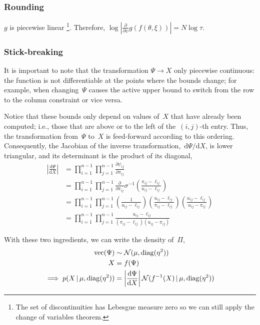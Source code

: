 \documentclass[twoside]{article}
\begin{document}
\subsubsection*{Rounding}

 $g$ is piecewise linear
\footnote{The set of discontinuities has Lebesgue measure zero so we
  can still apply the change of variables theorem.}. Therefore, 
$\log | \tfrac{\partial}{\partial \psi} g(f(\theta, \xi)) |= N\log
\tau$. 


\subsubsection*{Stick-breaking}

It is important to note that the transformation $\Psi\rightarrow X$ only piecewise
continuous: the function is not differentiable at the points where
the bounds change; for example, when changing~$\Psi$ causes the
active upper bound to switch from the row to the column constraint
or vice versa.  

Notice that these bounds only depend on values of~$X$ that
have already been computed; i.e., those that are above or to the left of
the~$(i,j)$-th entry. Thus, the transformation from~$\Psi$ to~$X$
is feed-forward according to this ordering.  Consequently, the
Jacobian of the inverse transformation,~$\mathrm{d}\Psi / \mathrm{d} X$,
is lower triangular, and its determinant is the product of its diagonal,
\begin{align}
\nonumber \left| \frac{\mathrm{d} \Psi} {\mathrm{d} X} \right|
&= \prod_{i=1}^{n-1} \prod_{j=1}^{n-1} \frac{\partial \psi_{ij} }{\partial {\pi}_{ij}} \\
\nonumber &= \prod_{i=1}^{n-1} \prod_{j=1}^{n-1} \frac{\partial}{\partial {\pi}_{ij}}
\sigma^{-1} \left( \frac{{\pi}_{ij} - \ell_{ij}}{u_{ij} - \ell_{ij}} \right ) \\
\nonumber &= \prod_{i=1}^{n-1} \prod_{j=1}^{n-1}
\left( \frac{1}{u_{ij} - \ell_{ij}} \right )
\left( \frac{u_{ij} - \ell_{ij}}{{\pi}_{ij} - \ell_{ij}} \right )
\left( \frac{u_{ij} - \ell_{ij}}{u_{ij} - {\pi}_{ij}} \right ) \\
\nonumber &= \prod_{i=1}^{n-1} \prod_{j=1}^{n-1}
\frac{u_{ij} - \ell_{ij}}{({\pi}_{ij} - \ell_{ij}) (u_{ij} - {\pi}_{ij})}
\end{align}

With these two ingredients, we can write the density of~${\Pi}$,
\begin{align}
 \nonumber  \text{vec} (\Psi) &\sim \mathcal{N}(\mu, \operatorname{diag}(\eta^2))
  \\
  \nonumber {X} &= f(\Psi) \\
  \implies
 \nonumber  p(X \, | \, \mu, \operatorname{diag}(\eta^2)) &= \left|\frac{\mathrm{d} \Psi }{\mathrm{d} {X}} \right|
\nonumber  \mathcal{N}(f^{-1}({X}) \, | \, \mu, \operatorname{diag}(\eta^2))
\end{align}
\end{document}
